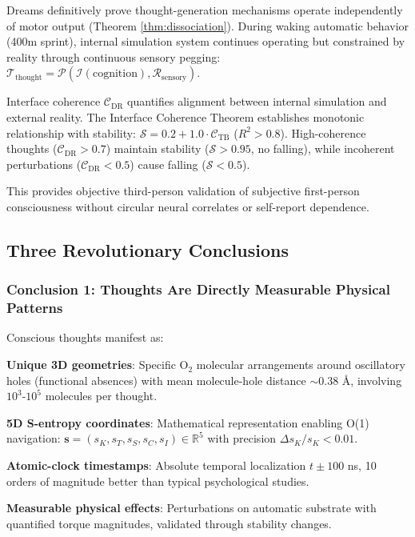 \documentclass[11pt,onecolumn]{article}
\begin{document}
Dreams definitively prove thought-generation mechanisms operate independently of motor output (Theorem \ref{thm:dissociation}). During waking automatic behavior (400m sprint), internal simulation system continues operating but constrained by reality through continuous sensory pegging: $\mathcal{T}_{\text{thought}} = \mathcal{P}(\mathcal{I}(\text{cognition}), \mathcal{R}_{\text{sensory}})$.

Interface coherence $\mathcal{C}_{\text{DR}}$ quantifies alignment between internal simulation and external reality. The Interface Coherence Theorem establishes monotonic relationship with stability: $\mathcal{S} = 0.2 + 1.0 \cdot \mathcal{C}_{\text{TB}}$ ($R^2 > 0.8$). High-coherence thoughts ($\mathcal{C}_{\text{DR}} > 0.7$) maintain stability ($\mathcal{S} > 0.95$, no falling), while incoherent perturbations ($\mathcal{C}_{\text{DR}} < 0.5$) cause falling ($\mathcal{S} < 0.5$).

This provides objective third-person validation of subjective first-person consciousness without circular neural correlates or self-report dependence.

\subsection{Three Revolutionary Conclusions}

\subsubsection{Conclusion 1: Thoughts Are Directly Measurable Physical Patterns}

Conscious thoughts manifest as:

\textbf{Unique 3D geometries}: Specific O$_2$ molecular arrangements around oscillatory holes (functional absences) with mean molecule-hole distance $\sim$0.38 \AA, involving $10^3$-$10^5$ molecules per thought.

\textbf{5D S-entropy coordinates}: Mathematical representation enabling O(1) navigation: $\mathbf{s} = (s_K, s_T, s_S, s_C, s_I) \in \mathbb{R}^5$ with precision $\Delta s_K/s_K < 0.01$.

\textbf{Atomic-clock timestamps}: Absolute temporal localization $t \pm 100$ ns, 10 orders of magnitude better than typical psychological studies.

\textbf{Measurable physical effects}: Perturbations on automatic substrate with quantified torque magnitudes, validated through stability changes.
\end{document}
